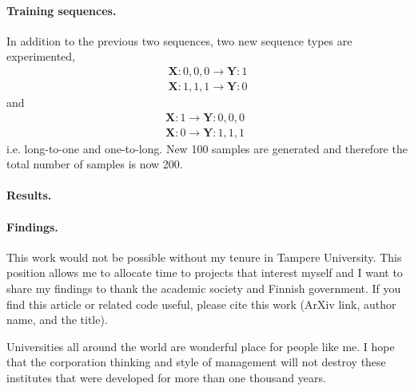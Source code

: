 \documentclass[final]{article}
\begin{document}
\paragraph{Training sequences.} In addition to the previous two
sequences, two new sequence types are experimented,
\begin{displaymath}
  \begin{split}
    \mathbf{X}: 0,0,0 \rightarrow \mathbf{Y}: 1\\
    \mathbf{X}: 1,1,1 \rightarrow \mathbf{Y}: 0
  \end{split}
\end{displaymath}
and
\begin{displaymath}
  \begin{split}
    \mathbf{X}: 1 \rightarrow \mathbf{Y}: 0, 0, 0\\
    \mathbf{X}: 0 \rightarrow \mathbf{Y}: 1, 1, 1
  \end{split} \enspace
\end{displaymath}
i.e. long-to-one and one-to-long. New 100 samples are generated and
therefore the total number of samples is now 200.

\paragraph{Results.}

\paragraph{Findings.}


\begin{ack}
This work would not be possible without my tenure in Tampere
University. This position allows me to allocate time to projects
that interest myself and I want to share my findings to thank the
academic society and Finnish government. If you find this article or
related code useful, please cite this work (ArXiv link, author name,
and the title).

Universities all around the world are wonderful place for people like
me. I hope that the corporation thinking and style of management will
not destroy these institutes that were developed for more than one
thousand years.
\end{ack}

\printbibliography
\end{document}
